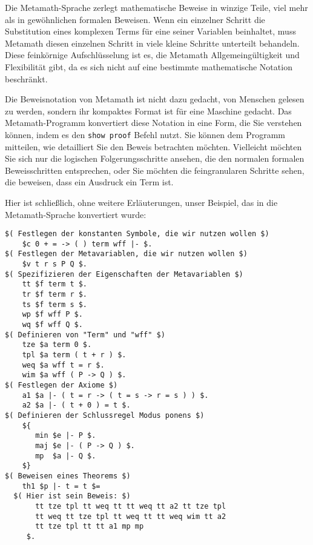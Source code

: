 Die Metamath-Sprache zerlegt mathematische Beweise in winzige Teile, viel mehr als in gewöhnlichen formalen Beweisen.  Wenn ein einzelner Schritt die Substitution eines
komplexen Terms für eine seiner Variablen beinhaltet, muss Metamath diesen einzelnen Schritt in viele kleine Schritte unterteilt behandeln.  Diese feinkörnige Aufschlüsselung ist es, die Metamath Allgemeingültigkeit und Flexibilität gibt, da es sich nicht auf eine bestimmte mathematische Notation beschränkt.

Die Beweisnotation von Metamath ist nicht dazu gedacht, von Menschen gelesen zu werden, sondern ihr kompaktes Format ist für eine Maschine gedacht.  Das Metamath-Programm konvertiert diese Notation in eine Form, die Sie verstehen können, indem es den \texttt{show proof} Befehl nutzt.  Sie können dem Programm mitteilen, wie detailliert Sie den Beweis betrachten möchten.  Vielleicht möchten Sie sich nur die logischen Folgerungsschritte ansehen, die den normalen formalen Beweisschritten entsprechen, oder Sie möchten die feingranularen Schritte sehen, die beweisen, dass ein Ausdruck ein Term ist.

Hier ist schließlich, ohne weitere Erläuterungen, unser Beispiel, das in die Metamath-Sprache konvertiert wurde:\label{demo0}

\begin{verbatim}
$( Festlegen der konstanten Symbole, die wir nutzen wollen $)
    $c 0 + = -> ( ) term wff |- $.
$( Festlegen der Metavariablen, die wir nutzen wollen $)
    $v t r s P Q $.
$( Spezifizieren der Eigenschaften der Metavariablen $)
    tt $f term t $.
    tr $f term r $.
    ts $f term s $.
    wp $f wff P $.
    wq $f wff Q $.
$( Definieren von "Term" und "wff" $)
    tze $a term 0 $.
    tpl $a term ( t + r ) $.
    weq $a wff t = r $.
    wim $a wff ( P -> Q ) $.
$( Festlegen der Axiome $)
    a1 $a |- ( t = r -> ( t = s -> r = s ) ) $.
    a2 $a |- ( t + 0 ) = t $.
$( Definieren der Schlussregel Modus ponens $)
    ${
       min $e |- P $.
       maj $e |- ( P -> Q ) $.
       mp  $a |- Q $.
    $}
$( Beweisen eines Theorems $)
    th1 $p |- t = t $=
  $( Hier ist sein Beweis: $)
       tt tze tpl tt weq tt tt weq tt a2 tt tze tpl
       tt weq tt tze tpl tt weq tt tt weq wim tt a2
       tt tze tpl tt tt a1 mp mp
     $.
\end{verbatim}

